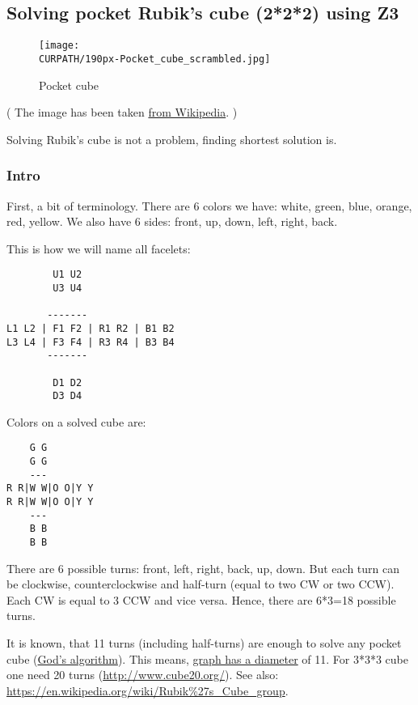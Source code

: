 \subsection{Solving pocket Rubik’s cube (2*2*2) using Z3}
\label{PocketCubeSMT}

\renewcommand{\CURPATH}{puzzles/rubik2/failed_SMT}

\begin{figure}[H]
\centering
\texttt{[image: \\CURPATH/190px-Pocket\_cube\_scrambled.jpg]}
\caption{Pocket cube}
\end{figure}

( The image has been taken \href{https://en.wikipedia.org/wiki/Pocket_Cube}{from Wikipedia}. )

Solving Rubik's cube is not a problem, finding shortest solution is.

\subsubsection{Intro}

First, a bit of terminology.
There are 6 colors we have: white, green, blue, orange, red, yellow.
We also have 6 sides: front, up, down, left, right, back.

This is how we will name all facelets:

\begin{lstlisting}
        U1 U2
        U3 U4

       -------
L1 L2 | F1 F2 | R1 R2 | B1 B2
L3 L4 | F3 F4 | R3 R4 | B3 B4
       -------

        D1 D2
        D3 D4
\end{lstlisting}

Colors on a solved cube are:

\begin{lstlisting}
    G G
    G G
    ---
R R|W W|O O|Y Y
R R|W W|O O|Y Y
    ---
    B B
    B B
\end{lstlisting}

There are 6 possible turns: front, left, right, back, up, down.
But each turn can be clockwise, counterclockwise and half-turn (equal to two CW or two CCW).
Each CW is equal to 3 CCW and vice versa.
Hence, there are 6*3=18 possible turns.

It is known, that 11 turns (including half-turns) are enough to solve any pocket cube
(\href{https://en.wikipedia.org/wiki/Optimal_solutions_for_Rubik%27s_Cube}{God’s algorithm}).
This means, \href{http://mathworld.wolfram.com/GraphDiameter.html}{graph has a diameter} of 11.
For 3*3*3 cube one need 20 turns (\url{http://www.cube20.org/}).
See also: \url{https://en.wikipedia.org/wiki/Rubik%27s_Cube_group}.

